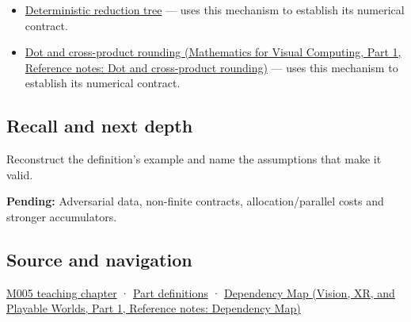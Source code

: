 \hypertarget{appendix-df318da57389-used-by}{}

\begin{itemize}
\tightlist
\item
  \hyperref[appendix-4c8e0238e7ee]{Deterministic reduction tree} --- uses this mechanism to establish its numerical contract.
\item
  \href{../02-Mathematics-for-Visual-Computing-P01/main.pdf\#appendix-5aef4f13483a}{Dot and cross-product rounding (Mathematics for Visual Computing, Part 1, Reference notes: Dot and cross-product rounding)} --- uses this mechanism to establish its numerical contract.
\end{itemize}

\subsection{Recall and next depth}\label{appendix-df318da57389-recall-and-next-depth}

\hypertarget{appendix-df318da57389-recall-and-next-depth}{}

Reconstruct the definition's example and name the assumptions that make it valid.

\textbf{Pending:} Adversarial data, non-finite contracts, allocation/parallel costs and stronger accumulators.

\subsection{Source and navigation}\label{appendix-df318da57389-source-and-navigation}

\hypertarget{appendix-df318da57389-source-and-navigation}{}

\hyperref[01-foundations-i-ch001-when-arithmetic-meets-uncertainty]{M005 teaching chapter} · \hyperref[appendix-fd090d982a15-m005---parts-77-88]{Part definitions} · \href{../07-Vision-XR-and-Playable-Worlds-P01/main.pdf\#appendix-4ad47bdd269a}{Dependency Map (Vision, XR, and Playable Worlds, Part 1, Reference notes: Dependency Map)}
